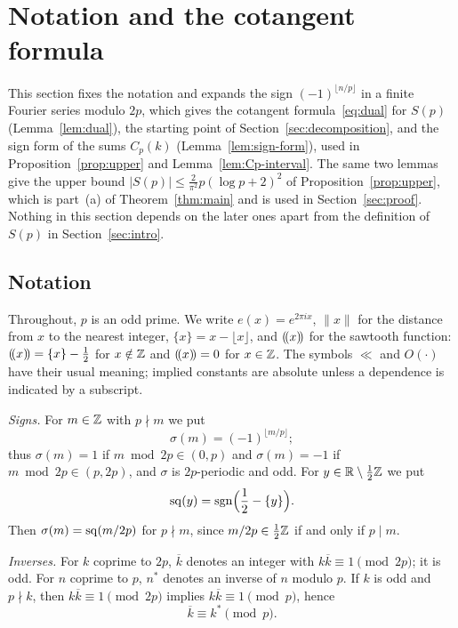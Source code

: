 \section{Notation and the cotangent formula}\label{sec:notation}

This section fixes the notation and expands the sign $(-1)^{\lfloor n/p\rfloor}$ in a finite Fourier series modulo $2p$, which gives the cotangent formula~\eqref{eq:dual} for $S(p)$ (Lemma~\ref{lem:dual}), the starting point of Section~\ref{sec:decomposition}, and the sign form of the sums $C_p(k)$ (Lemma~\ref{lem:sign-form}), used in Proposition~\ref{prop:upper} and Lemma~\ref{lem:Cp-interval}. The same two lemmas give the upper bound $|S(p)|\le\frac2{\pi^2}p(\log p+2)^2$ of Proposition~\ref{prop:upper}, which is part~(a) of Theorem~\ref{thm:main} and is used in Section~\ref{sec:proof}. Nothing in this section depends on the later ones apart from the definition of $S(p)$ in Section~\ref{sec:intro}.

\subsection{Notation}
Throughout, $p$ is an odd prime. We write $e(x)=e^{2\pi ix}$, $\|x\|$ for the distance from $x$ to the nearest integer, $\{x\}=x-\lfloor x\rfloor$, and $(\!(x)\!)$ for the sawtooth function: $(\!(x)\!)=\{x\}-\frac12$ for $x\notin\mathbb{Z}$ and $(\!(x)\!)=0$ for $x\in\mathbb{Z}$. The symbols $\ll$ and $O(\cdot)$ have their usual meaning; implied constants are absolute unless a dependence is indicated by a subscript.

\emph{Signs.} For $m\in\mathbb{Z}$ with $p\nmid m$ we put
\[
\sigma(m)=(-1)^{\lfloor m/p\rfloor};
\]
thus $\sigma(m)=1$ if $m\bmod2p\in(0,p)$ and $\sigma(m)=-1$ if $m\bmod2p\in(p,2p)$, and $\sigma$ is $2p$-periodic and odd. For $y\in\mathbb{R}\setminus\frac12\mathbb{Z}$ we put
\[
\operatorname{sq}(y)=\operatorname{sgn}\Bigl(\frac12-\{y\}\Bigr).
\]
Then $\sigma(m)=\operatorname{sq}(m/2p)$ for $p\nmid m$, since $m/2p\in\frac12\mathbb{Z}$ if and only if $p\mid m$.

\emph{Inverses.} For $k$ coprime to $2p$, $\overline k$ denotes an integer with $k\overline k\equiv1\pmod{2p}$; it is odd. For $n$ coprime to $p$, $n^*$ denotes an inverse of $n$ modulo $p$. If $k$ is odd and $p\nmid k$, then $k\overline k\equiv1\pmod{2p}$ implies $k\overline k\equiv1\pmod p$, hence
\[
\overline k\equiv k^*\pmod p.
\]

